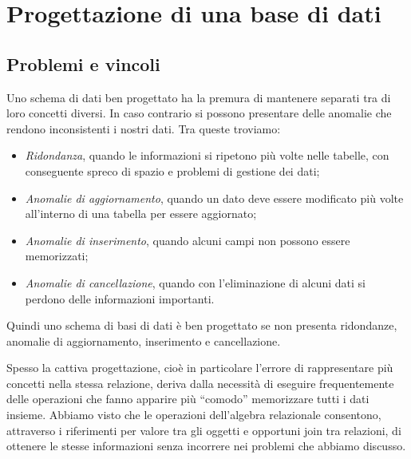 \chapter{Progettazione di una base di dati}

\section{Problemi e vincoli}
Uno schema di dati ben progettato ha la premura di mantenere separati tra di loro concetti diversi. In caso contrario si possono presentare delle anomalie che rendono inconsistenti i nostri dati. Tra queste troviamo:
\begin{itemize}
    \item \textit{Ridondanza}, quando le informazioni si ripetono più volte nelle tabelle, con conseguente spreco di spazio e problemi di gestione dei dati;
    \item \textit{Anomalie di aggiornamento}, quando un dato deve essere modificato più volte all'interno di una tabella per essere aggiornato;
    \item \textit{Anomalie di inserimento}, quando alcuni campi non possono essere memorizzati;
    \item \textit{Anomalie di cancellazione}, quando con l'eliminazione di alcuni dati si perdono delle informazioni importanti.
\end{itemize}

Quindi uno schema di basi di dati è ben progettato se non presenta ridondanze, anomalie di aggiornamento, inserimento e cancellazione.

Spesso la cattiva progettazione, cioè in particolare l'errore di rappresentare più concetti nella stessa relazione, deriva dalla necessità di eseguire frequentemente delle operazioni che fanno apparire più “comodo” memorizzare tutti i dati insieme.
Abbiamo visto che le operazioni dell'algebra relazionale consentono, attraverso i riferimenti per valore tra gli oggetti e opportuni join tra relazioni, di ottenere le stesse informazioni senza incorrere nei problemi che abbiamo discusso.

